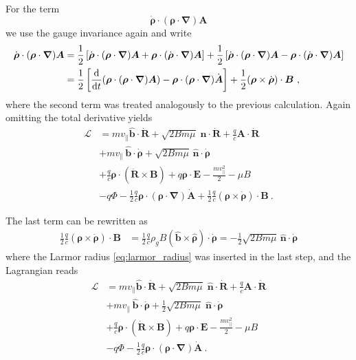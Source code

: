 \documentclass{scrartcl}
\renewcommand{\vec}[1]{\boldsymbol{#1}}
\newcommand{\uv}[1]{\hat{\vec{#1}}}
\newcommand{\bnabla}{\vec{\nabla}}
\newcommand{\rvgc}{\vec{R}} %
\newcommand{\PSL}{\mathcal{L}}
\newcommand{\subparallel}{{\scriptscriptstyle\parallel}}
\begin{document}
For the term
\begin{equation*}
\dot{\vec{\rho}}\cdot(\vec{\rho}\cdot\bnabla)\vec{A}
\end{equation*}
we use the gauge invariance again and write
\begin{align*}
\dot{\vec{\rho}}\cdot(\vec{\rho}\cdot\bnabla)\vec{A} &= \frac12\left[\dot{\vec{\rho}}\cdot(\vec{\rho}\cdot\bnabla)\vec{A} + \vec{\rho}\cdot(\dot{\vec{\rho}}\cdot\bnabla)\vec{A}\right] + \frac12\left[\dot{\vec{\rho}}\cdot(\vec{\rho}\cdot\bnabla)\vec{A} - \vec{\rho}\cdot(\dot{\vec{\rho}}\cdot\bnabla)\vec{A}\right] \\
&= \frac12\left[\dv{t}(\vec{\rho}\cdot(\vec{\rho}\cdot\bnabla)\vec{A}) - \vec{\rho}\cdot(\vec{\rho}\cdot\bnabla)\dot{\vec{A}}\right] + \frac12(\vec{\rho}\times\dot{\vec{\rho}})\cdot\vec{B} \ ,
\end{align*}
where the second term was treated analogously to the previous calculation. Again omitting the total derivative yields
\begin{align}
\PSL &= mv_\subparallel \uv{b}\cdot\dot{\rvgc} + \sqrt{2Bm\mu}\;\uv{n}\cdot\dot{\rvgc} + \frac{q}{c}\vec{A}\cdot\dot{\rvgc} \nonumber\\
& + mv_\subparallel\,\uv{b}\cdot\dot{\vec{\rho}} + \sqrt{2Bm\mu}\,\uv{n}\cdot\dot{\vec{\rho}} \nonumber\\
& + \frac{q}{c}\vec{\rho}\cdot(\dot{\rvgc}\times\vec{B}) + q\vec{\rho}\cdot\vec{E} - \frac{m v_\subparallel^2}{2} - \mu B \nonumber\\
& - q\Phi - \frac12\frac{q}{c}\vec{\rho}\cdot(\vec{\rho}\cdot\bnabla)\dot{\vec{A}} + \frac12\frac{q}{c}(\vec{\rho}\times\dot{\vec{\rho}})\cdot\vec{B} \ . \label{eq:psl_newcoords_gauge3}
\end{align}

The last term can be rewritten as
\begin{align*}
\frac12\frac{q}{c}(\vec{\rho}\times\dot{\vec{\rho}})\cdot\vec{B} &= \frac12\frac{q}{c}\rho_g B \left(\uv{b}\times\uv{\rho}\right)\cdot\dot{\vec{\rho}} = -\frac12\sqrt{2Bm\mu}\,\uv{n}\cdot\dot{\vec{\rho}}
\end{align*}
where the Larmor radius \eqref{eq:larmor_radius} was inserted in the last step, and the Lagrangian reads
\begin{align}
\PSL &= mv_\subparallel \uv{b}\cdot\dot{\rvgc} + \sqrt{2Bm\mu}\;\uv{n}\cdot\dot{\rvgc} + \frac{q}{c}\vec{A}\cdot\dot{\rvgc} \nonumber\\
& + mv_\subparallel\,\uv{b}\cdot\dot{\vec{\rho}} + \frac12\sqrt{2Bm\mu}\;\uv{n}\cdot\dot{\vec{\rho}} \nonumber\\
& + \frac{q}{c}\vec{\rho}\cdot(\dot{\rvgc}\times\vec{B}) + q\vec{\rho}\cdot\vec{E} - \frac{m v_\subparallel^2}{2} - \mu B \nonumber\\
& - q\Phi - \frac12\frac{q}{c}\vec{\rho}\cdot(\vec{\rho}\cdot\bnabla)\dot{\vec{A}} \ . \label{eq:psl_newcoords_gauge4}
\end{align}
\end{document}
